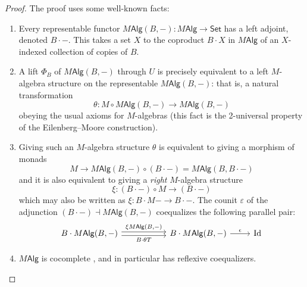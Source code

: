 \documentclass[12pt,reqno]{amsart}
\theoremstyle{plain}
\theoremstyle{definition}
\theoremstyle{remark}
\newcommand{\maps}{\colon}
\newcommand{\namedcat}[1]{\mathsf{#1}}
\newcommand{\Alg}{\namedcat{Alg}}
\newcommand{\Set}{\namedcat{Set}}
\numberwithin{thm}{section}
\begin{document}
\begin{proof}
    The proof uses some well-known facts:
    \begin{enumerate}
        \item Every representable functor $M\Alg(B, -) \maps M\Alg \to \Set$ has a left adjoint, denoted $B \cdot -$. This takes a set $X$ to the coproduct $B \cdot X$ in $M\Alg$ of an $X$-indexed collection of copies of $B$. 
        \item A lift $\Phi_B$ of $M\Alg(B, -)$ through $U$ is precisely equivalent to a left $M$-algebra structure on the representable $M\Alg(B, -)$: that is, a natural transformation
        \[
        \theta \maps M \circ M\Alg(B, -) \to M\Alg(B, -)
        \]
        obeying the usual axioms for $M$-algebras (this fact is the 2-universal property of the Eilenberg--Moore construction). 
        \item Giving such an $M$-algebra structure $\theta$ is equivalent to giving a morphism of monads 
        \[
        M \to M\Alg(B, -) \circ (B \cdot -) = M\Alg(B, B \cdot -)
        \]
        and it is also equivalent to giving a \emph{right} $M$-algebra structure 
        \[
        \xi \maps (B \cdot -) \circ M \to (B \cdot -)
        \]
        which may also be written as $\xi \maps B \cdot M- \to B \cdot -$. The counit $\varepsilon$ of the adjunction $(B \cdot -) \dashv M\Alg(B, -)$ coequalizes the following parallel pair:
        \[
        \begin{tikzcd}
            B \cdot M\Alg(B, -)  
            \arrow[r, shift left=0.5ex, "{\xi M\Alg(B, -)}"] 
            \arrow[r, shift right=0.5ex, swap, "B \cdot \theta T"] 
            & [3em] 
            B \cdot M\Alg(B, -) 
            \arrow[r, rightarrow, "\epsilon"] 
            & 
            \mathrm{Id} 
        \end{tikzcd}
        \]
        \item $M\Alg$ is cocomplete \cite[Theorem 4.3.5]{BorceuxII}, and in particular has reflexive coequalizers.
    \end{enumerate}
    

\end{proof}
\end{document}
